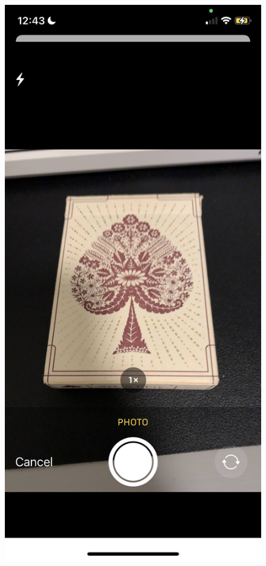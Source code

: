 \documentclass[a4paper,11pt]{article}
\begin{document}
\begin{figure}[H]
\centering
\includegraphics[scale=0.125]{img/app/capture1.png}

\end{figure}
\end{document}
